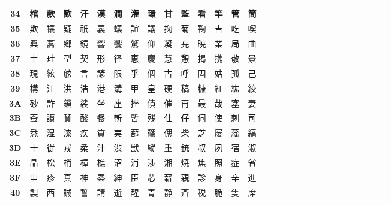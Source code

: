 \begin{table}[H]
\begin{tabular}{|Sc|Sc|Sc|Sc|Sc|Sc|Sc|Sc|Sc|Sc|Sc|Sc|Sc|Sc|Sc|}
\textbf{34} & 棺 & 款 & 歓 & 汗 & 漢 & 澗 & 潅 & 環 & 甘 & 監 & 看 & 竿 & 管 & 簡 \\ \hline
\textbf{35} & 欺 & 犠 & 疑 & 祇 & 義 & 蟻 & 誼 & 議 & 掬 & 菊 & 鞠 & 吉 & 吃 & 喫 \\ \hline
\textbf{36} & 興 & 蕎 & 郷 & 鏡 & 響 & 饗 & 驚 & 仰 & 凝 & 尭 & 暁 & 業 & 局 & 曲 \\ \hline
\textbf{37} & 圭 & 珪 & 型 & 契 & 形 & 径 & 恵 & 慶 & 慧 & 憩 & 掲 & 携 & 敬 & 景 \\ \hline
\textbf{38} & 現 & 絃 & 舷 & 言 & 諺 & 限 & 乎 & 個 & 古 & 呼 & 固 & 姑 & 孤 & 己 \\ \hline
\textbf{39} & 構 & 江 & 洪 & 浩 & 港 & 溝 & 甲 & 皇 & 硬 & 稿 & 糠 & 紅 & 紘 & 絞 \\ \hline
\textbf{3A} & 砂 & 詐 & 鎖 & 裟 & 坐 & 座 & 挫 & 債 & 催 & 再 & 最 & 哉 & 塞 & 妻 \\ \hline
\textbf{3B} & 蚕 & 讃 & 賛 & 酸 & 餐 & 斬 & 暫 & 残 & 仕 & 仔 & 伺 & 使 & 刺 & 司 \\ \hline
\textbf{3C} & 悉 & 湿 & 漆 & 疾 & 質 & 実 & 蔀 & 篠 & 偲 & 柴 & 芝 & 屡 & 蕊 & 縞 \\ \hline
\textbf{3D} & 十 & 従 & 戎 & 柔 & 汁 & 渋 & 獣 & 縦 & 重 & 銃 & 叔 & 夙 & 宿 & 淑 \\ \hline
\textbf{3E} & 晶 & 松 & 梢 & 樟 & 樵 & 沼 & 消 & 渉 & 湘 & 焼 & 焦 & 照 & 症 & 省 \\ \hline
\textbf{3F} & 申 & 疹 & 真 & 神 & 秦 & 紳 & 臣 & 芯 & 薪 & 親 & 診 & 身 & 辛 & 進 \\ \hline
\textbf{40} & 製 & 西 & 誠 & 誓 & 請 & 逝 & 醒 & 青 & 静 & 斉 & 税 & 脆 & 隻 & 席 \\ \hline
\end{tabular}
\end{table}

